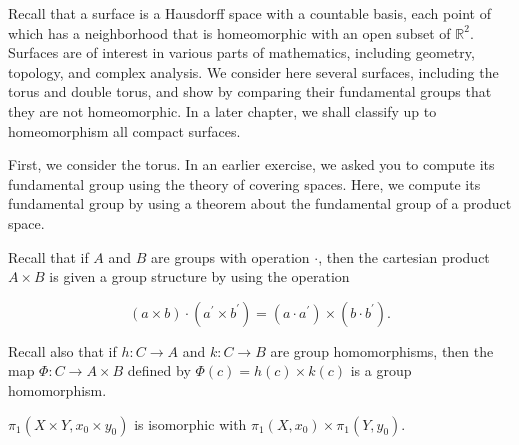 Recall that a surface is a Hausdorff space with a countable basis, each point of which has a neighborhood that is homeomorphic with an open subset of \(\mathbb{R}^{2}\). Surfaces are of interest in various parts of mathematics, including geometry, topology, and complex analysis. We consider here several surfaces, including the torus and double torus, and show by comparing their fundamental groups that they are not homeomorphic. In a later chapter, we shall classify up to homeomorphism all compact surfaces.

First, we consider the torus. In an earlier exercise, we asked you to compute its fundamental group using the theory of covering spaces. Here, we compute its fundamental group by using a theorem about the fundamental group of a product space.

Recall that if \(A\) and \(B\) are groups with operation \(\cdot\), then the cartesian product \(A \times B\) is given a group structure by using the operation

\[
( {a \times b}) \cdot ( {a^{\prime } \times {b}^{\prime }}) = ( {a \cdot {a}^{\prime }}) \times ( {b \cdot {b}^{\prime }}).
\]

Recall also that if \(h : C \rightarrow A\) and \(k : C \rightarrow B\) are group homomorphisms, then the map \(\Phi : C \rightarrow A \times B\) defined by \(\Phi ( c) = h( c) \times k( c)\) is a group homomorphism.

\begin{theorem}
\label{thm:\thetheorem}
\({\pi }_{1}( {X \times Y,x_{0} \times {y}_{0}})\) is isomorphic with \({\pi }_{1}( {X,x_{0}}) \times {\pi }_{1}( {Y,y_{0}})\).
\end{theorem}

